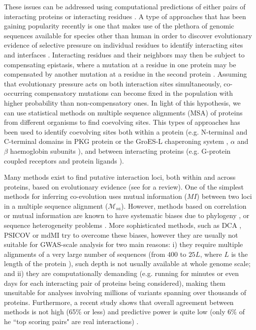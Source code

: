 These issues can be addressed using computational predictions of either pairs of interacting proteins or interacting residues \cite{shoemaker2007decipheringP2}. A type of approaches that has been gaining popularity recently is one that makes use of the plethora of genomic sequences available for species other than human in order to discover evolutionary evidence of selective pressure on individual residues to identify interacting sites and interfaces \cite{marks2012protein}. Interacting residues and their neighbors may then be subject to compensating epistasis, where a mutation at a residue in one protein may be compensated by another mutation at a residue in the second protein \cite{pazos1997correlated}. Assuming that evolutionary pressure acts on both interaction sites simultaneously, co-occurring compensatory mutations can become fixed in the population with higher probability than non-compensatory ones. In light of this hypothesis, we can use statistical methods on multiple sequence alignments (MSA) of proteins from different organisms to find coevolving sites. This types of approaches has been used to identify coevolving sites both within a protein (e.g. N-terminal and C-terminal domains in PKG protein \cite{goh2000co} or the GroES-L chaperoning system \cite{ruiz2013coevolution}, $\alpha$ and $\beta$ haemoglobin subunits \cite{pazos1997correlated}), and between interacting proteins (e.g. G-protein coupled receptors and protein ligands \cite{goh2000co}).

Many methods exist to find putative interaction loci, both within and across proteins, based on evolutionary evidence (see \cite{de2013emerging} for a review). One of the simplest methods for inferring co-evolution uses mutual information ($MI$) between two loci \cite{marks2012protein} in a multiple sequence alignment ($\mathcal{M}_{sa}$). However, methods based on correlation or mutual information are known to have systematic biases due to phylogeny \cite{de2013emerging}, or sequence heterogeneity problems \cite{weigt2009identification}. More sophisticated methods, such as DCA \cite{morcos2011direct}, PSICOV \cite{jones2012psicov} or mdMI \cite{clark2014multidimensional} try to overcome these biases, however they are usually not suitable for GWAS-scale analysis for two main reasons: i) they require multiple alignments of a very large number of sequences (from $400$ to $25L$, where $L$ is the length of the protein \cite{clark2014multidimensional}), such depth is not usually available at whole genome scale; and ii) they are computationally demanding (e.g. running for minutes or even days for each interacting pair of proteins being considered), making them unsuitable for analyses involving millions of variants spanning over thousands of proteins. Furthermore, a recent study shows that overall agreement between methods is not high (65\% or less) and predictive power is quite low (only 6\% of he “top scoring pairs" are real interactions) \cite{clark2014multidimensional}.

